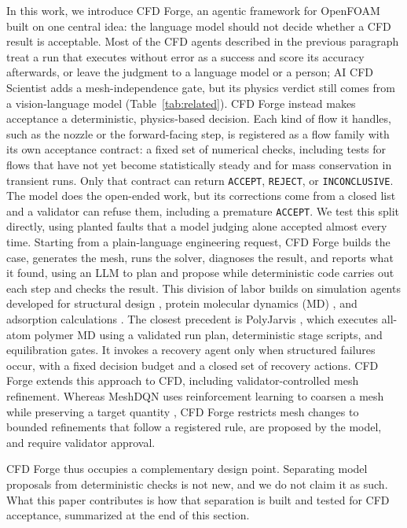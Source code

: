 \documentclass[11pt]{article}
\begin{document}
In this work, we introduce CFD Forge, an agentic framework for OpenFOAM built on one central idea: the language model should not decide whether a CFD result is acceptable. Most of the CFD agents described in the previous paragraph treat a run that executes without error as a success and score its accuracy afterwards, or leave the judgment to a language model or a person; AI CFD Scientist adds a mesh-independence gate, but its physics verdict still comes from a vision-language model (Table~\ref{tab:related}). CFD Forge instead makes acceptance a deterministic, physics-based decision. Each kind of flow it handles, such as the nozzle or the forward-facing step, is registered as a flow family with its own acceptance contract: a fixed set of numerical checks, including tests for flows that have not yet become statistically steady and for mass conservation in transient runs. Only that contract can return \texttt{ACCEPT}, \texttt{REJECT}, or \texttt{INCONCLUSIVE}. The model does the open-ended work, but its corrections come from a closed list and a validator can refuse them, including a premature \texttt{ACCEPT}. We test this split directly, using planted faults that a model judging alone accepted almost every time. Starting from a plain-language engineering request, CFD Forge builds the case, generates the mesh, runs the solver, diagnoses the result, and reports what it found, using an LLM to plan and propose while deterministic code carries out each step and checks the result. This division of labor builds on simulation agents developed for structural design \cite{jadhav2026mechdesigner}, protein molecular dynamics (MD) \cite{baratifarimani2025namdagent}, and adsorption calculations \cite{ock2026adsorbagent}. The closest precedent is PolyJarvis \cite{zhao2026polyjarvis}, which executes all-atom polymer MD using a validated run plan, deterministic stage scripts, and equilibration gates. It invokes a recovery agent only when structured failures occur, with a fixed decision budget and a closed set of recovery actions. CFD Forge extends this approach to CFD, including validator-controlled mesh refinement. Whereas MeshDQN uses reinforcement learning to coarsen a mesh while preserving a target quantity \cite{lorsung2023meshdqn}, CFD Forge restricts mesh changes to bounded refinements that follow a registered rule, are proposed by the model, and require validator approval.

CFD Forge thus occupies a complementary design point. Separating model proposals from deterministic checks is not new, and we do not claim it as such. What this paper contributes is how that separation is built and tested for CFD acceptance, summarized at the end of this section.
\end{document}
